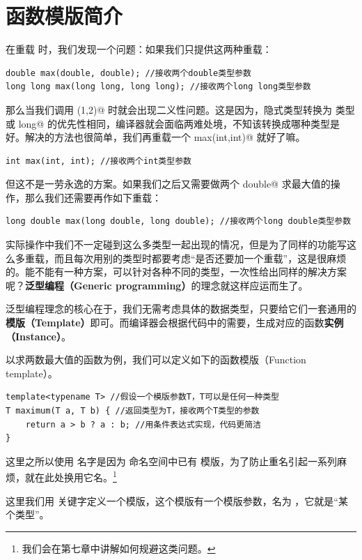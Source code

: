 \section{函数模版简介}
在重载 \lstinline@max@ 时，我们发现一个问题：如果我们只提供这两种重载：
\begin{lstlisting}
double max(double, double); //接收两个double类型参数
long long max(long long, long long); //接收两个long long类型参数
\end{lstlisting}
那么当我们调用 \lstinline@max(1,2)@ 时就会出现二义性问题。这是因为，\lstinline@int@ 隐式类型转换为 \lstinline@double@ 类型或 \lstinline@long long@ 的优先性相同，编译器就会面临两难处境，不知该转换成哪种类型是好。解决的方法也很简单，我们再重载一个 \lstinline@int max(int,int)@ 就好了嘛。
\begin{lstlisting}
int max(int, int); //接收两个int类型参数
\end{lstlisting}\par
但这不是一劳永逸的方案。如果我们之后又需要做两个 \lstinline@long double@ 求最大值的操作，那么我们还需要再作如下重载：
\begin{lstlisting}
long double max(long double, long double); //接收两个long double类型参数
\end{lstlisting}\par
实际操作中我们不一定碰到这么多类型一起出现的情况，但是为了同样的功能写这么多重载，而且每次用别的类型时都要考虑``是否还要加一个重载''，这是很麻烦的。能不能有一种方案，可以针对各种不同的类型，一次性给出同样的解决方案呢？\textbf{泛型编程（Generic programming）}的理念就这样应运而生了。\par
泛型编程理念的核心在于，我们无需考虑具体的数据类型，只要给它们一套通用的\textbf{模版（Template）}即可。而编译器会根据代码中的需要，生成对应的函数\textbf{实例（Instance）}。\par
以求两数最大值的函数为例，我们可以定义如下的函数模版（Function template）。
\begin{lstlisting}
template<typename T> //假设一个模版参数T，T可以是任何一种类型
T maximum(T a, T b) { //返回类型为T，接收两个T类型的参数
    return a > b ? a : b; //用条件表达式实现，代码更简洁
}
\end{lstlisting}
这里之所以使用 \lstinline@maxinum@ 名字是因为 \lstinline@std@ 命名空间中已有 \lstinline@max@ 模版，为了防止重名引起一系列麻烦，就在此处换用它名。\footnote{我们会在第七章中讲解如何规避这类问题。}\par
这里我们用 \lstinline@template@ 关键字定义一个模版，这个模版有一个模版参数，名为 \lstinline@T@，它就是``某个类型''。\par
